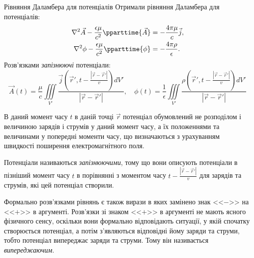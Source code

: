 \documentclass[9pt]{beamer}
\let\vect\vec
\begin{document}
\begin{frame}{Рівняння Даламбера для потенціалів}{}
	Отримали рівняння Даламбера для потенціалів:
	\begin{align*}
		\nabla^2\vect{A} - \frac{ \epsilon\mu }{c^2} \pparttime{\vect{A}} & = - \frac{4\pi\mu}{c}\vect{j}, \\
		\nabla^2\phi - \frac{ \epsilon\mu }{c^2} \pparttime{\phi}         & = - \frac{4\pi\rho}{\epsilon}.
	\end{align*}
	Розв'язками \emph{запізнюючі} потенціали:
	{\small 	\begin{equation*}
		\vect{A}(t)= \frac{\mu}{c} \iiint\limits_{V'} \frac{\vect{j}\left(\vect{r}', t - \frac{|\vect{r} - \vect{r}'|}{v}\right) dV'}{|\vect{r} - \vect{r}'|}, \quad
		\phi(t) = \frac{1}{\epsilon} \iiint\limits_{V'} \frac{\rho\left(\vect{r}', t - \frac{|\vect{r} - \vect{r}'|}{v}\right) dV'}{|\vect{r} - \vect{r}'|}
	\end{equation*}}

	\begin{overprint}
		\begin{alertblock}{}\small\justifying
			В даний момент часу $ t $ в даній точці $ \vect{r} $ потенціал обумовлений не розподілом і величиною зарядів і струмів у даний момент часу, а їх положеннями та величинами у попередні моменти часу, що визначаються з урахуванням швидкості поширення електромагнітного поля.
		\end{alertblock}
		\begin{alertblock}{}\small\justifying
			Потенціали називаються \emph{запізнюючими}, тому що вони описують потенціали в пізніший момент часу $ t $ в порівнянні з моментом часу $ t - \frac{|\vect{r} - \vect{r}'|}{v} $ для зарядів та струмів, які цей потенціал створили.
		\end{alertblock}
		\begin{alertblock}{}\small\justifying
			Формально розв'язками рівнянь є також вирази в яких замінено знак <<$ - $>> на <<$ + $>> в аргументі. Розв'язки зі знаком <<$ + $>> в аргументі не мають ясного фізичного сенсу, оскільки вони формально відповідають ситуації, у якій спочатку створюється потенціал, а потім з'являються відповідні йому заряди та струми, тобто потенціал випереджає заряди та струми. Тому він називається \emph{випереджаючим}.
		\end{alertblock}
	\end{overprint}
\end{frame}
\end{document}
